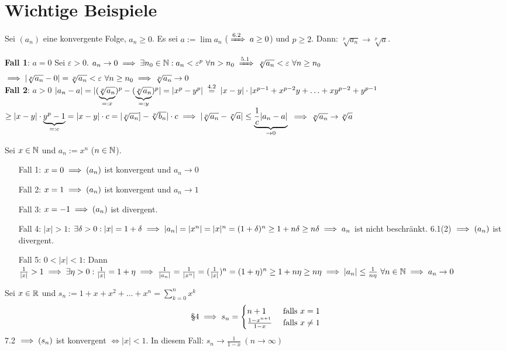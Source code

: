 \documentclass[a4paper,oneside,DIV15,BCOR12mm]{scrbook}
\begin{document}
\chapter{Wichtige Beispiele}

\begin{satz}
Sei $(a_n)$ eine konvergente Folge, $a_n\ge0$. Es sei $a := \lim a_n$ ($\displaystyle\folgtnach{6.2} a \ge 0$) und $p \ge 2$. Dann: $\sqrt[p]{a_n} \to \sqrt[p]{a}$.
\end{satz}

\begin{beweis}
\textbf{Fall 1}: $a=0$ Sei $\varepsilon >0$.
$a_n\to0 \folgt \exists n_0 \in \MdN: a_n < \varepsilon^p \ \forall n >n_0 \folgtnach{5.1} \sqrt[p]{a_n} < \varepsilon \ \forall n \ge n_0 $
$\implies |\sqrt[p]{a_n} - 0| = \sqrt[p]{a_n} < \varepsilon \ \forall n \ge n_0 \implies \sqrt[p]{a_n} \to 0$\\
\textbf{Fall 2}: $a>0$
$ |a_n - a| = |(\underbrace{\sqrt[p]{a_n}}_{=: x})^p - (\underbrace{\sqrt[p]{a_n}}_{=: y})^p| = |x^p - y^p| \gleichnach{4.2} |x - y| \cdot |x^{p-1} + x^{p-2}y + \ldots + xy^{p-2} + y^{p-1}$
$\ge |x-y| \cdot \underbrace{y^p-1}_{=: c} = |x-y|\cdot c = |\sqrt[p]{a_n}] - \sqrt[p]{b_n}|\cdot c \implies |\sqrt[p]{a_n} - \sqrt[p]{a}| \le \underbrace{\frac{1}{c}|a_n-a|}_{\to 0} $
$ \implies \sqrt[p]{a_n} \to \sqrt[p]{a} $
\end{beweis}

\begin{wichtigesbeispiel}
Sei $x\in\mathbb{N}$ und $a_n := x^n$ ($n\in\mathbb{N}$).
\begin{itemize}
\item[Fall 1:] $x=0 \implies (a_n)$ ist konvergent und $a_n \to 0$
\item[Fall 2:] $x=1 \implies (a_n)$ ist konvergent und $a_n \to 1$
\item[Fall 3:] $x=-1 \implies (a_n)$ ist divergent.
\item[Fall 4:] $|x| > 1$: $\exists \delta > 0 : |x| = 1+\delta \implies |a_n| = |x^n| = |x|^n = (1+\delta)^n \ge 1+n\delta \ge n\delta \implies a_n$ ist nicht beschränkt. 6.1(2) $\implies (a_n)$ ist divergent.
\item[Fall 5:] $0 <|x|<1$: Dann $\frac{1}{|x|} > 1 \implies \exists \eta>0: \frac{1}{|x|} = 1+\eta \implies \frac{1}{|a_n|} = \frac{1}{|x^n|} = (\frac{1}{|x|})^n = (1+\eta)^n \ge 1+n\eta \ge n\eta \implies |a_n| \le \frac{1}{n\eta} \ \forall n\in\mathbb{N} \implies a_n \to 0$
\end{itemize}
\end{wichtigesbeispiel}
\begin{wichtigesbeispiel}
\item Sei $x\in\mathbb{R}$ und $s_n := 1+x+x^2+\ldots+x^n=\displaystyle\sum_{k=0}^n x^k$
$$ \text{§4} \implies s_n=\begin{cases}n+1 & \text{ falls }x=1 \\ \frac{1-x^{n+1}}{1-x} & \text{ falls }x\ne 1\end{cases} $$
7.2 $\implies (s_n)$ ist konvergent $\iff |x| < 1$. In diesem Fall: $s_n \to \frac{1}{1-x}\ (n \to \infty)$
\end{wichtigesbeispiel}
\end{document}
